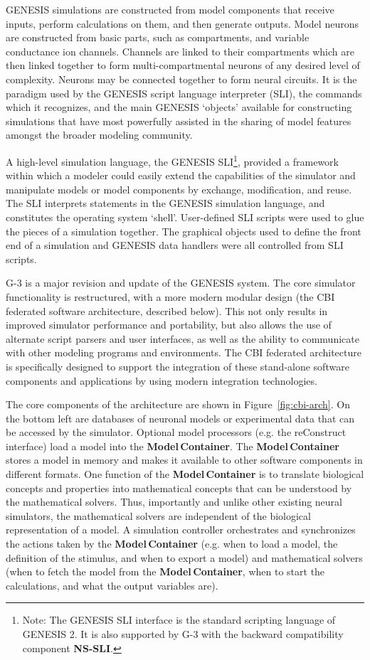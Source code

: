 \documentclass[12pt]{article}
\begin{document}
GENESIS simulations are constructed from model components that receive
inputs, perform calculations on them, and then generate outputs. Model
neurons are constructed from basic parts, such as compartments, and
variable conductance ion channels. Channels are linked to their
compartments which are then linked together to form
multi-compartmental neurons of any desired level of complexity.
Neurons may be connected together to form neural circuits.  It is the
paradigm used by the GENESIS script language interpreter (SLI), the
commands which it recognizes, and the main GENESIS `objects' available
for constructing simulations that have most powerfully assisted in the
sharing of model features amongst the broader modeling community.

A high-level simulation language, the GENESIS SLI\footnote{Note: The
  GENESIS SLI interface is the standard scripting language of GENESIS
  2. It is also supported by G-3 with the backward compatibility
  component {\bf NS-SLI}.}, provided a framework within which a
modeler could easily extend the capabilities of
the simulator and manipulate models or model components by exchange, modification, and reuse. The SLI interprets statements in the
GENESIS simulation language, and constitutes the operating system
`shell'. User-defined SLI scripts were used to glue the pieces of a
simulation together. The graphical objects used to define the front
end of a simulation and GENESIS data handlers were all controlled from
SLI scripts.

G-3 is a major revision and update of the GENESIS system.  The core
simulator functionality is restructured, with a more modern modular
design (the CBI federated software architecture, described below). This not
only results in improved simulator performance and portability, but
also allows the use of alternate script parsers and user interfaces,
as well as the ability to communicate with other modeling programs and
environments. The CBI federated architecture is specifically designed
to support the integration of these stand-alone software components
and applications by using modern integration technologies.

The core components of the architecture are shown in
Figure~\ref{fig:cbi-arch}. On the bottom left are databases of
neuronal models or experimental data that can be accessed by the
simulator. Optional model processors (e.g. the reConstruct interface) load a model into the {\bf Model\,Container}.  The {\bf Model\,Container}
stores a model in memory and makes it available to other software
components in different formats.  One function of the {\bf Model\,Container}
is to translate biological concepts and properties into mathematical
concepts that can be understood by the mathematical solvers. Thus,
importantly and unlike other existing neural simulators, the
mathematical solvers are independent of the biological representation
of a model. A simulation controller orchestrates and synchronizes
the actions taken by the {\bf Model\,Container} (e.g. when to load a model,
the definition of the stimulus, and when to export a model) and
mathematical solvers (when to fetch the model from the {\bf Model\,Container}, when to start the calculations, and what the output
variables are).
\end{document}

